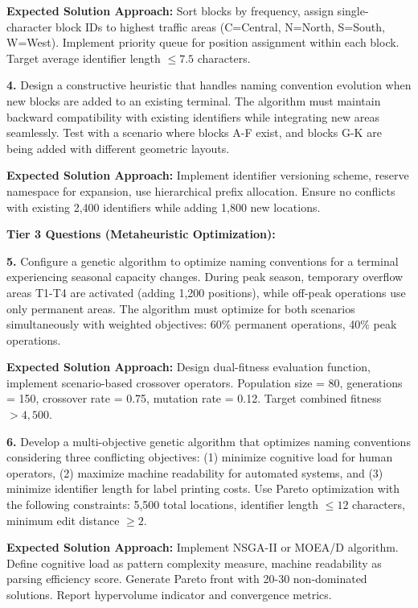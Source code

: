 \documentclass{article}
\begin{document}
\textbf{Expected Solution Approach:} Sort blocks by frequency, assign single-character block IDs to highest traffic areas (C=Central, N=North, S=South, W=West). Implement priority queue for position assignment within each block. Target average identifier length $\leq 7.5$ characters.

\textbf{4.} Design a constructive heuristic that handles naming convention evolution when new blocks are added to an existing terminal. The algorithm must maintain backward compatibility with existing identifiers while integrating new areas seamlessly. Test with a scenario where blocks A-F exist, and blocks G-K are being added with different geometric layouts.

\textbf{Expected Solution Approach:} Implement identifier versioning scheme, reserve namespace for expansion, use hierarchical prefix allocation. Ensure no conflicts with existing 2,400 identifiers while adding 1,800 new locations.

\textbf{Tier 3 Questions (Metaheuristic Optimization):}

\textbf{5.} Configure a genetic algorithm to optimize naming conventions for a terminal experiencing seasonal capacity changes. During peak season, temporary overflow areas T1-T4 are activated (adding 1,200 positions), while off-peak operations use only permanent areas. The algorithm must optimize for both scenarios simultaneously with weighted objectives: 60\% permanent operations, 40\% peak operations.

\textbf{Expected Solution Approach:} Design dual-fitness evaluation function, implement scenario-based crossover operators. Population size = 80, generations = 150, crossover rate = 0.75, mutation rate = 0.12. Target combined fitness $> 4,500$.

\textbf{6.} Develop a multi-objective genetic algorithm that optimizes naming conventions considering three conflicting objectives: (1) minimize cognitive load for human operators, (2) maximize machine readability for automated systems, and (3) minimize identifier length for label printing costs. Use Pareto optimization with the following constraints: 5,500 total locations, identifier length $\leq 12$ characters, minimum edit distance $\geq 2$.

\textbf{Expected Solution Approach:} Implement NSGA-II or MOEA/D algorithm. Define cognitive load as pattern complexity measure, machine readability as parsing efficiency score. Generate Pareto front with 20-30 non-dominated solutions. Report hypervolume indicator and convergence metrics.
\end{document}
